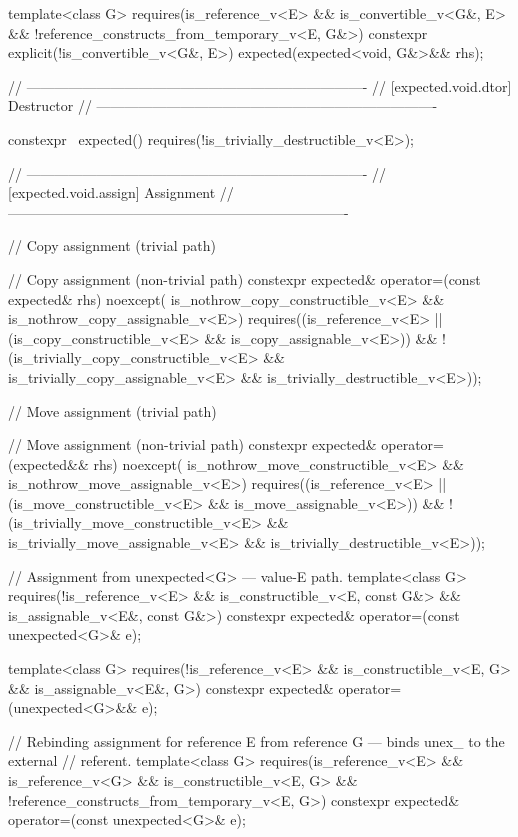 \begin{codeblock}
{  template<class G>
    requires(is_reference_v<E> && is_convertible_v<G&, E> &&
             !reference_constructs_from_temporary_v<E, G&>)
  constexpr explicit(!is_convertible_v<G&, E>) expected(expected<void, G&>&& rhs);

  // -------------------------------------------------------------------------
  // [expected.void.dtor] Destructor
  // -------------------------------------------------------------------------

  constexpr ~expected()
    requires(!is_trivially_destructible_v<E>);

  // -------------------------------------------------------------------------
  // [expected.void.assign] Assignment
  // -------------------------------------------------------------------------

  // Copy assignment (trivial path)

  // Copy assignment (non-trivial path)
  constexpr expected& operator=(const expected& rhs) noexcept(
      is_nothrow_copy_constructible_v<E> && is_nothrow_copy_assignable_v<E>)
    requires((is_reference_v<E> ||
              (is_copy_constructible_v<E> && is_copy_assignable_v<E>)) &&
             !(is_trivially_copy_constructible_v<E> &&
               is_trivially_copy_assignable_v<E> && is_trivially_destructible_v<E>));

  // Move assignment (trivial path)

  // Move assignment (non-trivial path)
  constexpr expected& operator=(expected&& rhs) noexcept(
      is_nothrow_move_constructible_v<E> && is_nothrow_move_assignable_v<E>)
    requires((is_reference_v<E> ||
              (is_move_constructible_v<E> && is_move_assignable_v<E>)) &&
             !(is_trivially_move_constructible_v<E> &&
               is_trivially_move_assignable_v<E> && is_trivially_destructible_v<E>));

  // Assignment from unexpected<G> — value-E path.
  template<class G>
    requires(!is_reference_v<E> && is_constructible_v<E, const G&> &&
             is_assignable_v<E&, const G&>)
  constexpr expected& operator=(const unexpected<G>& e);

  template<class G>
    requires(!is_reference_v<E> && is_constructible_v<E, G> && is_assignable_v<E&, G>)
  constexpr expected& operator=(unexpected<G>&& e);

  // Rebinding assignment for reference E from reference G — binds unex_ to the external
  // referent.
  template<class G>
    requires(is_reference_v<E> && is_reference_v<G> && is_constructible_v<E, G> &&
             !reference_constructs_from_temporary_v<E, G>)
  constexpr expected& operator=(const unexpected<G>& e);

}
\end{codeblock}
